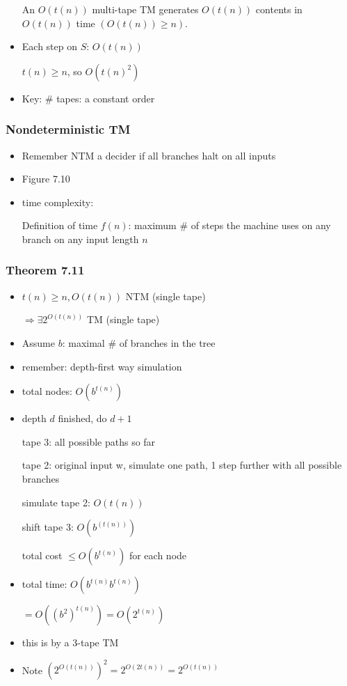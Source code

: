 \begin{frame}[allowframebreaks]
\begin{itemize}
An $O(t(n))$ multi-tape TM generates
$O(t(n))$ contents in 
$O(t(n))$ time $(O(t(n))\geq n)$.


\item Each step on $S$: $O(t(n))$

$t(n) \geq n$, so $O(t(n)^2)$


\item Key: \# tapes: a constant order

\end{itemize}\end{frame} \begin{frame}[allowframebreaks] \frametitle{Nondeterministic TM}
  \begin{itemize}
\item Remember NTM a decider if all branches halt on all inputs
\item Figure 7.10

\item time complexity:

Definition of time $f(n)$: maximum \# of steps the machine uses on any branch
on any input length $n$

\end{itemize}\end{frame} \begin{frame}[allowframebreaks] \frametitle{Theorem 7.11}
  \begin{itemize}
  \item $t(n) \geq n, O(t(n))$ NTM (single tape)

$\Rightarrow \exists 2^{O(t(n))}$ TM (single tape)
\item Assume $b$: maximal \# of branches in the tree
\item remember: depth-first way simulation
\item total nodes: $O(b^{t(n)})$
\item depth $d$ finished, do $d+1$

tape 3: all possible paths so far

tape 2: original input w, simulate one path, 1 step further
with all possible branches

simulate tape 2: $O(t(n))$

shift tape 3: $O(b^{(t(n))})$

total cost $\leq O(b^{t(n)})$ for each node
\item total time: $O(b^{t(n)}b^{t(n)})$

$=O((b^2)^{t(n)} )
= O(2^{t(n)})$


\item this is by a 3-tape TM
\item Note $(2^{O(t(n))})^2
= 2^{O(2t(n))}
= 2^{O(t(n))}$


\end{itemize}
\end{frame}
